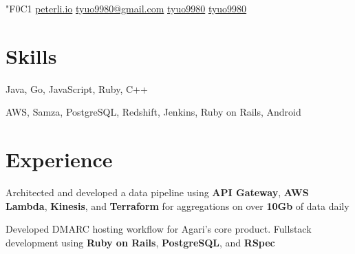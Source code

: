 \documentclass[]{peter_resume}
\begin{document}

{

   {\fa\char"F0C1} \href{http://peterli.io}{peterli.io}
     \href{mailto:tyuo9980@gmail.com}{tyuo9980@gmail.com}
     \href{https://github.com/tyuo9980}{tyuo9980}
     \href{https://www.linkedin.com/in/tyuo9980}{tyuo9980} 
}
\sectionsep
\vspace{0.3cm}

\begin{minipage}{\textwidth}


\section{Skills}
{\hspace{2.1cm} Java, Go, JavaScript, Ruby, C++}
\vspace{0.1cm}

{\hspace{1.5cm} AWS, Samza, PostgreSQL, Redshift, Jenkins, Ruby on Rails, Android}
\sectionsep


\section{Experience}
\vspace{\topsep} %
\begin{tightemize}
\item Architected and developed a data pipeline using \textbf{API Gateway}, \textbf{AWS Lambda}, \textbf{Kinesis}, and \textbf{Terraform} for aggregations on over \textbf{10Gb} of data daily
\item Developed DMARC hosting workflow for Agari's core product. Fullstack development using \textbf{Ruby on Rails}, \textbf{PostgreSQL}, and \textbf{RSpec}
\end{tightemize}
\sectionsep


\end{minipage}
\end{document}
